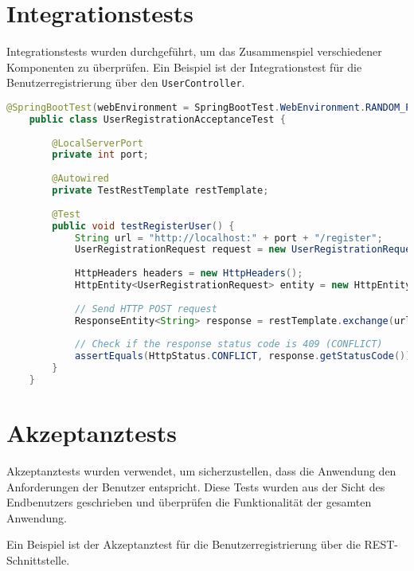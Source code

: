 \section{Integrationstests}

Integrationstests wurden durchgeführt, um das Zusammenspiel verschiedener Komponenten zu überprüfen. Ein Beispiel ist der Integrationstest für die Benutzerregistrierung über den \texttt{UserController}.

\begin{lstlisting}[language=Java]
	@SpringBootTest(webEnvironment = SpringBootTest.WebEnvironment.RANDOM_PORT)
	public class UserRegistrationAcceptanceTest {
		
		@LocalServerPort
		private int port;
		
		@Autowired
		private TestRestTemplate restTemplate;
		
		@Test
		public void testRegisterUser() {
			String url = "http://localhost:" + port + "/register";
			UserRegistrationRequest request = new UserRegistrationRequest("testuser", "password", "password");
			
			HttpHeaders headers = new HttpHeaders();
			HttpEntity<UserRegistrationRequest> entity = new HttpEntity<>(request, headers);
			
			// Send HTTP POST request
			ResponseEntity<String> response = restTemplate.exchange(url, HttpMethod.POST, entity, String.class);
			
			// Check if the response status code is 409 (CONFLICT)
			assertEquals(HttpStatus.CONFLICT, response.getStatusCode());
		}
	}
\end{lstlisting}


\section{Akzeptanztests}

Akzeptanztests wurden verwendet, um sicherzustellen, dass die Anwendung den Anforderungen der Benutzer entspricht. Diese Tests wurden aus der Sicht des Endbenutzers geschrieben und überprüfen die Funktionalität der gesamten Anwendung.

Ein Beispiel ist der Akzeptanztest für die Benutzerregistrierung über die REST-Schnittstelle.



